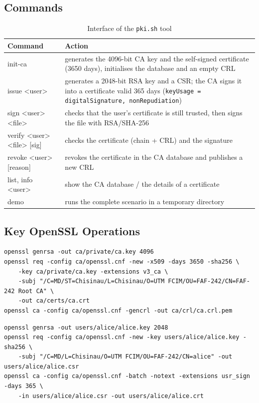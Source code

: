 \documentclass[12pt,a4paper]{article}
\begin{document}
\subsection{Commands}
\begin{table}[H]
\centering
\caption{Interface of the \texttt{pki.sh} tool}
\begin{tabularx}{\textwidth}{>{\ttfamily}l X}
\toprule
\textrm{Command} & Action \\
\midrule
init-ca & generates the 4096-bit CA key and the self-signed certificate (3650 days), initialises the database and an empty CRL \\
issue <user> & generates a 2048-bit RSA key and a CSR; the CA signs it into a certificate valid 365 days (\texttt{keyUsage = digitalSignature, nonRepudiation}) \\
sign <user> <file> & checks that the user's certificate is still trusted, then signs the file with RSA/SHA-256 \\
verify <user> <file> [sig] & checks the certificate (chain + CRL) and the signature \\
revoke <user> [reason] & revokes the certificate in the CA database and publishes a new CRL \\
list, info <user> & show the CA database / the details of a certificate \\
demo & runs the complete scenario in a temporary directory \\
\bottomrule
\end{tabularx}
\end{table}

\subsection{Key OpenSSL Operations}
\begin{lstlisting}[style=sh, caption={CA initialisation}]
openssl genrsa -out ca/private/ca.key 4096
openssl req -config ca/openssl.cnf -new -x509 -days 3650 -sha256 \
    -key ca/private/ca.key -extensions v3_ca \
    -subj "/C=MD/ST=Chisinau/L=Chisinau/O=UTM FCIM/OU=FAF-242/CN=FAF-242 Root CA" \
    -out ca/certs/ca.crt
openssl ca -config ca/openssl.cnf -gencrl -out ca/crl/ca.crl.pem
\end{lstlisting}

\begin{lstlisting}[style=sh, caption={Issuing a user key and certificate}]
openssl genrsa -out users/alice/alice.key 2048
openssl req -config ca/openssl.cnf -new -key users/alice/alice.key -sha256 \
    -subj "/C=MD/L=Chisinau/O=UTM FCIM/OU=FAF-242/CN=alice" -out users/alice/alice.csr
openssl ca -config ca/openssl.cnf -batch -notext -extensions usr_sign -days 365 \
    -in users/alice/alice.csr -out users/alice/alice.crt
\end{lstlisting}
\end{document}
